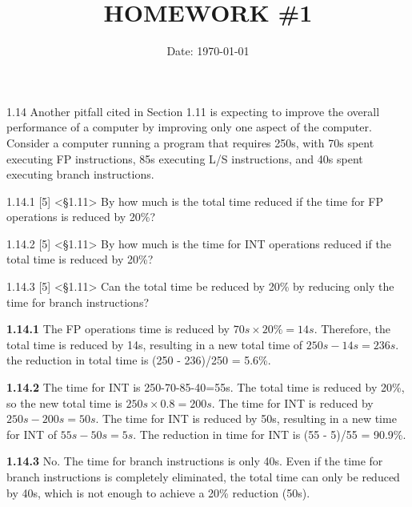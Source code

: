 \documentclass[cn,12pt]{homework}
\title{HOMEWORK \#1} %
\date{Date: \today} %
\institute{ZHEJIANG UNIVERSITY\quad COLLEGE OF INFORMATION SCIENCE AND ELECTRONICS ENGINEERING} %
\begin{document}
\maketitle



\begin{problem}


1.14 Another pitfall cited in Section 1.11 is expecting to improve the overall 
performance of a computer by improving only one aspect of the computer. Consider 
a computer running a program that requires 250s, with 70s spent executing FP 
instructions, 85s executing L/S instructions, and 40s spent executing branch instructions.

1.14.1 [5] <§1.11> By how much is the total time reduced if the time for FP 
operations is reduced by 20\%?

1.14.2 [5] <§1.11> By how much is the time for INT operations reduced if the 
total time is reduced by 20\%?

1.14.3 [5] <§1.11> Can the total time be reduced by 20\% by reducing only 
the time for branch instructions?
\end{problem}


\begin{solution}
  \quad

\textbf{1.14.1} The FP operations time is reduced by $70s \times 20\% = 14s$. Therefore, the total time is reduced by 14s, resulting in a new total time of $250s - 14s = 236s$.
the reduction in total time is (250 - 236)/250 = 5.6\%.
 
\textbf{1.14.2} The time for INT is 250-70-85-40=55s. The total time is reduced by 20\%, 
so the new total time is $250s \times 0.8 = 200s$. The time for INT is reduced by $250s - 200s = 50s$. 
The time for INT is reduced by 50s, resulting in a new time for INT of $55s - 50s = 5s$.
The reduction in time for INT is (55 - 5)/55 = 90.9\%.

\textbf{1.14.3} No. The time for branch instructions is only 40s. Even if the time for branch instructions is completely eliminated, the total time can only be reduced by 40s, which is not enough to achieve a 20\% reduction (50s).

\end{solution}


\end{document}
